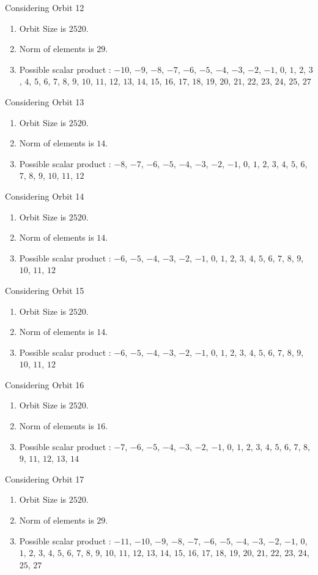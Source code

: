 \documentclass[12pt]{article}
\begin{document}
Considering Orbit 12
\begin{enumerate}
\item Orbit Size is $2520$.
\item Norm of elements is $29$.
\item Possible scalar product : $-10$, $-9$, $-8$, $-7$, $-6$, $-5$, $-4$, $-3$, $-2$, $-1$, $0$, $1$, $2$, $3$, $4$, $5$, $6$, $7$, $8$, $9$, $10$, $11$, $12$, $13$, $14$, $15$, $16$, $17$, $18$, $19$, $20$, $21$, $22$, $23$, $24$, $25$, $27$
\end{enumerate}
Considering Orbit 13
\begin{enumerate}
\item Orbit Size is $2520$.
\item Norm of elements is $14$.
\item Possible scalar product : $-8$, $-7$, $-6$, $-5$, $-4$, $-3$, $-2$, $-1$, $0$, $1$, $2$, $3$, $4$, $5$, $6$, $7$, $8$, $9$, $10$, $11$, $12$
\end{enumerate}
Considering Orbit 14
\begin{enumerate}
\item Orbit Size is $2520$.
\item Norm of elements is $14$.
\item Possible scalar product : $-6$, $-5$, $-4$, $-3$, $-2$, $-1$, $0$, $1$, $2$, $3$, $4$, $5$, $6$, $7$, $8$, $9$, $10$, $11$, $12$
\end{enumerate}
Considering Orbit 15
\begin{enumerate}
\item Orbit Size is $2520$.
\item Norm of elements is $14$.
\item Possible scalar product : $-6$, $-5$, $-4$, $-3$, $-2$, $-1$, $0$, $1$, $2$, $3$, $4$, $5$, $6$, $7$, $8$, $9$, $10$, $11$, $12$
\end{enumerate}
Considering Orbit 16
\begin{enumerate}
\item Orbit Size is $2520$.
\item Norm of elements is $16$.
\item Possible scalar product : $-7$, $-6$, $-5$, $-4$, $-3$, $-2$, $-1$, $0$, $1$, $2$, $3$, $4$, $5$, $6$, $7$, $8$, $9$, $11$, $12$, $13$, $14$
\end{enumerate}
Considering Orbit 17
\begin{enumerate}
\item Orbit Size is $2520$.
\item Norm of elements is $29$.
\item Possible scalar product : $-11$, $-10$, $-9$, $-8$, $-7$, $-6$, $-5$, $-4$, $-3$, $-2$, $-1$, $0$, $1$, $2$, $3$, $4$, $5$, $6$, $7$, $8$, $9$, $10$, $11$, $12$, $13$, $14$, $15$, $16$, $17$, $18$, $19$, $20$, $21$, $22$, $23$, $24$, $25$, $27$
\end{enumerate}
\end{document}
